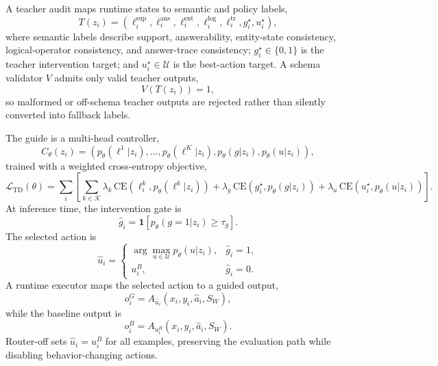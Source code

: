 \documentclass[11pt]{article}
\begin{document}
A teacher audit maps runtime states to semantic and policy labels,
\begin{equation}
T(z_i)=(\ell_i^{\mathrm{sup}},\ell_i^{\mathrm{ans}},\ell_i^{\mathrm{ent}},\ell_i^{\mathrm{log}},\ell_i^{\mathrm{tr}},g_i^\star,u_i^\star),
\end{equation}
where semantic labels describe support, answerability, entity-state consistency, logical-operator consistency, and answer-trace consistency; \(g_i^\star\in\{0,1\}\) is the teacher intervention target; and \(u_i^\star\in\mathcal{U}\) is the best-action target. A schema validator \(V\) admits only valid teacher outputs,
\begin{equation}
V(T(z_i))=1,
\end{equation}
so malformed or off-schema teacher outputs are rejected rather than silently converted into fallback labels.

The guide is a multi-head controller,
\begin{equation}
C_\theta(z_i)=\left(p_\theta(\ell^1|z_i),\ldots,p_\theta(\ell^K|z_i),p_\theta(g|z_i),p_\theta(u|z_i)\right),
\end{equation}
trained with a weighted cross-entropy objective,
\begin{equation}
\mathcal{L}_{\mathrm{TD}}(\theta)=\sum_i\left[\sum_{k\in\mathcal{K}}\lambda_k\,\mathrm{CE}(\ell_i^k,p_\theta(\ell^k|z_i))+\lambda_g\,\mathrm{CE}(g_i^\star,p_\theta(g|z_i))+\lambda_u\,\mathrm{CE}(u_i^\star,p_\theta(u|z_i))\right].
\end{equation}
At inference time, the intervention gate is
\begin{equation}
\hat{g}_i=\mathbf{1}\left[p_\theta(g=1|z_i)\geq\tau_g\right].
\end{equation}
The selected action is
\begin{equation}
\hat{u}_i=
\begin{cases}
\arg\max_{u\in\mathcal{U}}p_\theta(u|z_i), & \hat{g}_i=1,\\
u_i^B, & \hat{g}_i=0.
\end{cases}
\end{equation}
A runtime executor maps the selected action to a guided output,
\begin{equation}
o_i^G=A_{\hat{u}_i}(x_i,y_i,\hat{a}_i,S_W),
\end{equation}
while the baseline output is
\begin{equation}
o_i^B=A_{u_i^B}(x_i,y_i,\hat{a}_i,S_W).
\end{equation}
Router-off sets \(\hat{u}_i=u_i^B\) for all examples, preserving the evaluation path while disabling behavior-changing actions.
\end{document}

